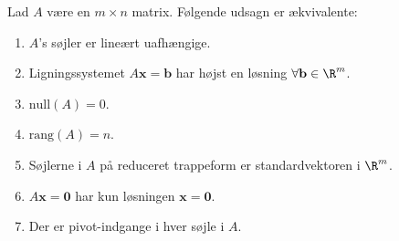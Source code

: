 \begin{thm}{}{}
%
Lad $A$ være en $m \times n$ matrix.
Følgende udsagn er ækvivalente:
%
\begin{enumerate}[label=(\alph*)]
\item $A$'s søjler er lineært uafhængige. 
\item Ligningssystemet $A\mathbf{x}=\mathbf{b}$ har højst en løsning $\forall \mathbf{b} \in \R^m$.
\item $\text{null}(A)=0$.
\item $\text{rang}(A)=n$.
\item Søjlerne i $A$ på reduceret trappeform er standardvektoren i $\R^m$.
\item $A\mathbf{x}=\mathbf{0}$ har kun løsningen $\mathbf{x}=\mathbf{0}$.                                                                                                                                                                                                                                                                                                                         
\item Der er pivot-indgange i hver søjle i $A$. 
\end{enumerate}
%
\end{thm}
%
